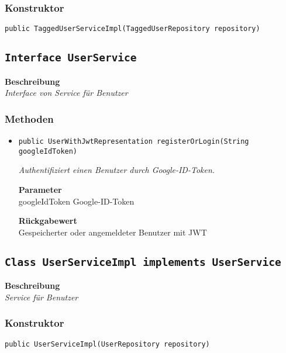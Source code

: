     \subsubsection*{Konstruktor}
    \texttt{public TaggedUserServiceImpl(TaggedUserRepository repository)}
    \subsection{\texttt{Interface UserService}}
    \textbf{Beschreibung} \\
    \textit{Interface von Service für Benutzer}
    \subsubsection*{Methoden}
    \begin{itemize}
    	\item{\texttt{public UserWithJwtRepresentation registerOrLogin(String googleIdToken)}}
    	
    	\textit{Authentifiziert einen Benutzer durch Google-ID-Token.}
    	
    	\textbf{Parameter} \\
    	googleIdToken Google-ID-Token
    	
    	\textbf{Rückgabewert} \\
    	Gespeicherter oder angemeldeter Benutzer mit JWT
    \end{itemize}
    \subsection{\texttt{Class UserServiceImpl implements UserService}}
    \textbf{Beschreibung} \\
    \textit{Service für Benutzer}
    \subsubsection*{Konstruktor}
    \texttt{public UserServiceImpl(UserRepository repository)}

%